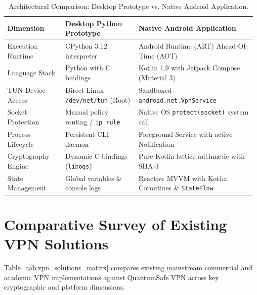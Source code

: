 \begin{table}[htbp]
  \centering
  \small
  \caption{Architectural Comparison: Desktop Prototype vs. Native Android Application.}
  \label{tab:python_vs_android_architecture}
  \begin{tabularx}{\linewidth}{@{}p{3.2cm}YY@{}}
    \toprule
    \textbf{Dimension} & \textbf{Desktop Python Prototype} & \textbf{Native Android Application} \\
    \midrule
    Execution Runtime & CPython 3.12 interpreter & Android Runtime (ART) Ahead-Of-Time (AOT) \\
    Language Stack & Python with C bindings & Kotlin 1.9 with Jetpack Compose (Material 3) \\
    TUN Device Access & Direct Linux \texttt{/dev/net/tun} (Root) & Sandboxed \texttt{android.net.VpnService} \\
    Socket Protection & Manual policy routing / \texttt{ip rule} & Native OS \texttt{protect(socket)} system call \\
    Process Lifecycle & Persistent CLI daemon & Foreground Service with active Notification \\
    Cryptography Engine & Dynamic C-bindings (\texttt{liboqs}) & Pure-Kotlin lattice arithmetic with SHA-3 \\
    State Management & Global variables \& console logs & Reactive MVVM with Kotlin Coroutines \& \texttt{StateFlow} \\
    \bottomrule
  \end{tabularx}
\end{table}

\section{Comparative Survey of Existing VPN Solutions}
\label{sec:comparative_survey}

Table~\ref{tab:vpn_solutions_matrix} compares existing mainstream commercial and academic VPN implementations against QuantumSafe VPN across key cryptographic and platform dimensions.

